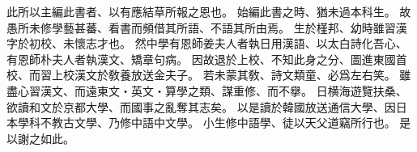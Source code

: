 此所以主編此書者、以有應結草所報之恩也。
始編此書之時、猶未過本科生。
故愚所未修學藝甚蕃、看書而頻借其所語、不語其所由焉。
生於槿邦、幼時雖習漢字於初校、未懷志才也。
然中學有恩師姜夫人者執日用漢語、以太白詩化吾心、有恩師朴夫人者執漢文、矯章句病。
因故退於上校、不知此身之分、圖進東國首校、而習上校漢文於敎養放送金夫子。
若未蒙其敎、詩文類童、必爲左右笑。
雖盡心習漢文、而遠東文・英文・算學之類、謀重修、而不擧。
日横海遊覽扶桑、欲讀和文於京都大學、而國事之亂奪其志矣。
以是讀於韓國放送通信大學、因日本學科不教古文學、乃修中語中文學。
小生修中語學、徒以天父道竊所行也。
是以謝之如此。
